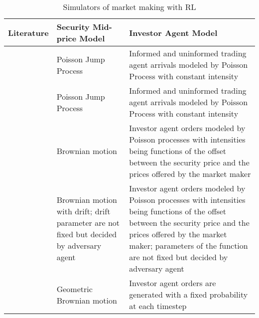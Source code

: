 \begin{table}[]
    \centering
\begin{tabular}{m{2cm}  m{5 cm} m{7cm}} 
  \hline
  Literature & Security Mid-price Model & Investor Agent Model \\
  \hline

  \citet{chan2001electronic} & Poisson Jump Process &   Informed and uninformed trading
agent arrivals modeled by Poisson Process with constant intensity 
\\
  \hline
  \citet{mani2019applications} & Poisson Jump Process &   Informed and uninformed trading
agent arrivals modeled by Poisson Process with constant intensity
\\
  \hline

  \citet{selser2021optimal} & Brownian motion &   Investor agent orders modeled by Poisson processes with intensities being functions of the offset between the security price and the prices offered by the market maker \\
  \hline

  \citet{spooner2020robust} & Brownian motion with drift; drift parameter are not fixed but decided by adversary agent&   Investor agent orders modeled by Poisson processes with intensities being functions of the offset between the security price and the prices offered by the market maker; parameters of the function are not fixed but decided by adversary agent \\
  \hline

  \citet{Ganesh2019MM} & Geometric Brownian motion &   Investor agent orders are generated with a fixed probability at each timestep \\
  \hline


\end{tabular}
    \caption{Simulators of market making with RL}
    \label{table:market_making_simulators}
\end{table}


